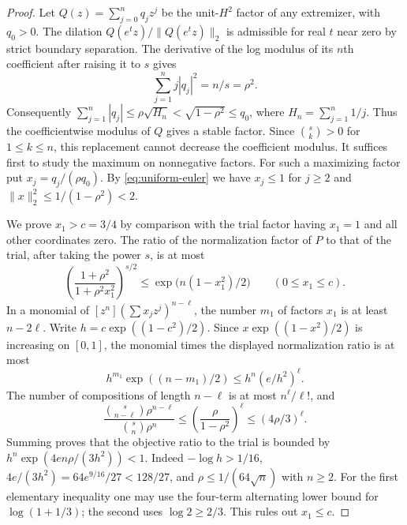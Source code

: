 \documentclass[11pt]{article}
\begin{document}
\begin{proof}
Let \(Q(z)=\sum_{j=0}^n q_jz^j\) be the unit-\(H^2\) factor
of any extremizer, with \(q_0>0\).
The dilation \(Q(e^t z)/\|Q(e^t z)\|_2\) is admissible
for real \(t\) near zero by strict boundary separation.
The derivative of the log modulus of its \(n\)th coefficient
after raising it to \(s\) gives
\begin{equation}\label{eq:uniform-euler}
 \sum_{j=1}^n j |q_j|^2=n/s=\rho^2.
\end{equation}
Consequently
\(\sum_{j=1}^n |q_j|\leq\rho\sqrt{H_n}<\sqrt{1-\rho^2}
\leq q_0\), where \(H_n=\sum_{j=1}^n 1/j\).
Thus the coefficientwise modulus of \(Q\) gives a stable factor.
Since \(\binom{s}{k}>0\) for \(1\leq k\leq n\), this
replacement cannot decrease the coefficient modulus.
It suffices first to study the maximum on nonnegative factors.
For such a maximizing factor put \(x_j=q_j/(\rho q_0)\).
By \eqref{eq:uniform-euler} we have \(x_j\leq1\) for \(j\geq2\)
and \(\|x\|_2^2\leq1/(1-\rho^2)<2\).

We prove \(x_1>c=3/4\) by comparison with the trial factor
having \(x_1=1\) and all other coordinates zero. The ratio
of the normalization factor of \(P\) to that of the trial,
after taking the power \(s\), is at most
\[
 \left(\frac{1+\rho^2}{1+\rho^2 x_1^2}\right)^{s/2}
 \leq \exp\bigl(n(1-x_1^2)/2\bigr)
 \qquad(0\leq x_1\leq c).
\]
In a monomial of \([z^n](\sum x_jz^j)^{n-\ell}\),
the number \(m_1\) of factors \(x_1\) is at least \(n-2\ell\).
Write \(h=c\exp((1-c^2)/2)\). Since
\(x\exp((1-x^2)/2)\) is increasing on \([0,1]\), the
monomial times the displayed normalization ratio is at most
\[
 h^{m_1}\exp((n-m_1)/2)\leq h^n(e/h^2)^\ell .
\]
The number of compositions of length \(n-\ell\) is at most
\(n^\ell/\ell!\), and
\[
 \frac{\binom{s}{n-\ell}\rho^{n-\ell}}{\binom{s}{n}\rho^n}
 \leq\left(\frac{\rho}{1-\rho^2}\right)^\ell
 \leq(4\rho/3)^\ell .
\]
Summing proves that the objective ratio to the trial is bounded
by \(h^n\exp(4en\rho/(3h^2))<1\). Indeed
\(-\log h>1/16\), \(4e/(3h^2)=64e^{9/16}/27<128/27\),
and \(\rho\leq1/(64\sqrt n)\) with \(n\geq2\).
For the first elementary inequality one may use the
four-term alternating lower bound for \(\log(1+1/3)\);
the second uses \(\log2\geq 2/3\).
This rules out \(x_1\leq c\).


\end{proof}
\end{document}
